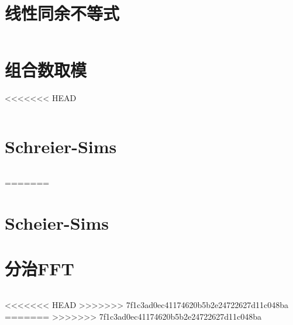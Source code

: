 \section{线性同余不等式}
\inputminted{cpp}{\source/number-theory/linear-inequaltion.cpp}
\section{组合数取模}
<<<<<<< HEAD
\inputminted{cpp}{\source/number-theory/module.cpp}
\section{Schreier-Sims}
\inputminted{cpp}{\source/number-theory/Schreier-Sims.cpp}
=======
\section{Scheier-Sims}
\section{分治FFT}
\inputminted{cpp}{\source/number-theory/cdq-fft.cpp}
<<<<<<< HEAD
>>>>>>> 7f1c3ad0ec41174620b5b2e24722627d11c048ba
=======
>>>>>>> 7f1c3ad0ec41174620b5b2e24722627d11c048ba

